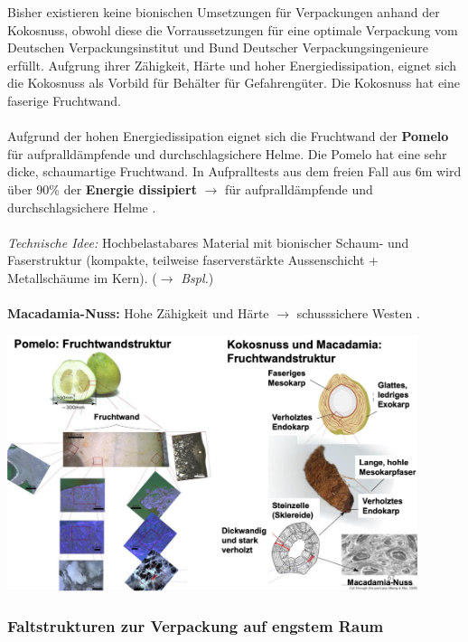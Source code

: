 Bisher existieren keine bionischen Umsetzungen für Verpackungen anhand der Kokosnuss, obwohl diese die Vorraussetzungen für eine optimale Verpackung vom Deutschen Verpackungsinstitut und Bund Deutscher Verpackungsingenieure erfüllt. Aufgrung ihrer Zähigkeit, Härte und hoher Energiedissipation, eignet sich die Kokosnuss als Vorbild für Behälter für Gefahrengüter. Die Kokosnuss hat eine faserige Fruchtwand.
\\\\
Aufgrund der hohen Energiedissipation eignet sich die Fruchtwand der \textbf{Pomelo} für aufpralldämpfende und durchschlagsichere Helme. Die Pomelo hat eine sehr dicke, schaumartige Fruchtwand. In Aufpralltests aus dem freien Fall aus 6m wird über 90\% der \textbf{Energie dissipiert} $\rightarrow$ für aufpralldämpfende und durchschlagsichere Helme \hintsign.
\\\\
\textit{Technische Idee:} Hochbelastabares Material mit bionischer Schaum- und Faserstruktur (kompakte, teilweise faserverstärkte Aussenschicht + Metallschäume im Kern). (\dangersign $\rightarrow$ \textit{Bspl.})
\\\\
\textbf{Macadamia-Nuss:} Hohe Zähigkeit und Härte $\rightarrow$ schusssichere Westen \hintsign.

\begin{center}
    \includegraphics[width=12cm]{lec6/figures/fruchtwand.png}
\end{center}

\subsubsection{Faltstrukturen zur Verpackung auf engstem Raum}

